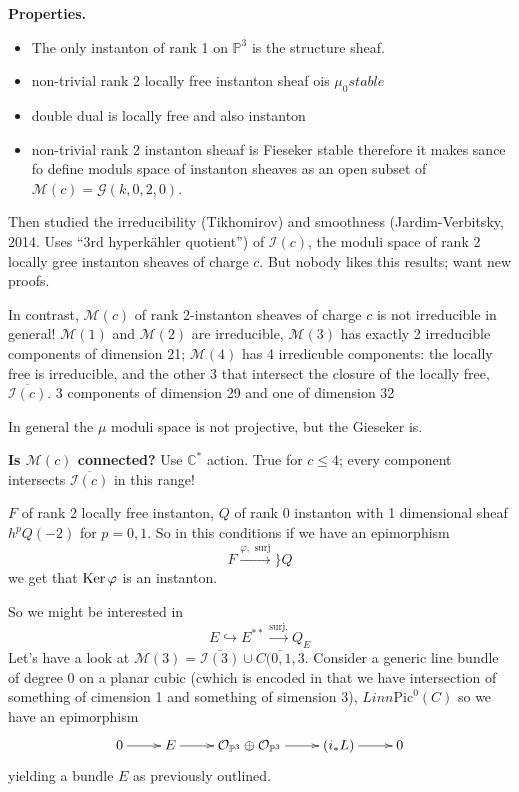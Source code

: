 \noindent
{\bf Properties.}
\begin{itemize}
\item The only instanton of rank 1 on $\mathbb{P}^3$ is the structure sheaf.
\item non-trivial rank 2 locally free instanton sheaf ois  $\mu_0stable$
\item double dual is locally free and also instanton
\item non-trivial rank 2 instanton sheaaf is Fieseker stable
therefore it makes sance fo define moduls space of instanton sheaves as an open
subset of $\mathcal{M}(c)=\mathcal{G}(k,0,2,0)$.
\end{itemize}

Then studied the irreducibility (Tikhomirov) and smoothness (Jardim-Verbitsky,
2014. Uses ``3rd hyperkähler quotient'') of $\mathcal{I}(c)$, the moduli
space of rank 2 locally gree instanton sheaves of charge $c.$ But nobody likes
this results; want new proofs.

In contrast, $\mathcal{M}(c)$ of rank 2-instanton sheaves of charge $c$ is not
irreducible in general!
$\mathcal{M}(1)$ and $\mathcal{M}(2)$ are irreducible, $\mathcal{M}(3)$ has
exactly 2 irreducible components of dimension 21;
 $\mathcal{M}(4)$ has 4 irredicuble components: 
the locally free is irreducible, and the other 3 that intersect the closure of
the locally
free, $\overline{\mathcal{I}(c)}$. 3 components of dimension 29 and one of dimension 32

\begin{remark}
\label{remark-}
In general the $\mu$ moduli space is not projective, but the Gieseker is.
\end{remark}


\noindent
{\bf Is $\mathcal{M}(c)$ connected?} Use $\mathbb{C}^*$ action. True for $c \leq
4$; every component intersects $\overline{\mathcal{I}(c)}$ in this range!

\begin{definition}
\label{definition-elementary-transformation}
$F$ of rank 2 locally free instanton, $Q$ of rank 0 instanton with 1 dimensional
sheaf $h^p Q(-2)$ for $p = 0,1$. So in this conditions if we have an epimorphism
 $$
F \overset{\varphi,\text{ surj}}{\to}\} Q
$$
we get that $\mathop{\mathrm{Ker}} \varphi$ is an instanton.
\end{definition}

So  we might be interested in
$$
E \hookrightarrow E^{* *}\xrightarrow{\text{surj.}} Q_E
$$
Let's have a look at $\mathcal{M}(3)=\overline{\mathcal{I}(3)}\cup
\overline{C(0,1,3}$. Consider a generic line bundle of degree 0 on a planar
cubic (cwhich is encoded in that we have intersection of something of cimension
1 and something of simension 3), $L inn \text{Pic}^0(C)$ so we have an
epimorphism
$$
\xymatrix{
0\ar[r]&E\ar[r]&\mathcal{O}_{\mathbb{P}^3}\oplus
\mathcal{O}_{\mathbb{P}^3}\ar[r]&(i_* L)\ar[r]&0
}
$$
yielding a bundle $E$ as previously outlined.

